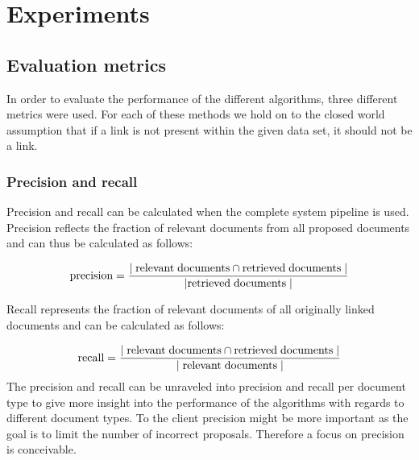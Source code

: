 \section{Experiments}
\label{sec:experiments}
\subsection{Evaluation metrics}
In order to evaluate the performance of the different algorithms, three different metrics were used. For each of these methods we hold on to the closed world assumption that if a link is not present within the given data set, it should not be a link. 

\subsubsection{Precision and recall} 
Precision and recall can be calculated when the complete system pipeline is used. Precision reflects the fraction of relevant documents from all proposed documents and can thus be calculated as follows:

\begin{align*}
  \textrm{precision} = \frac{|\;\textrm{relevant\;documents} \cap \textrm{retrieved\;documents}\;|}{|\textrm{retrieved\;documents}\;|}
\end{align*}

Recall represents the fraction of relevant documents of all originally linked documents and can be calculated as follows:

\begin{align}
  \nonumber \textrm{recall} = \frac{|\;\textrm{relevant\;documents} \cap \textrm{retrieved\;documents}\;|}{|\;\textrm{relevant\;documents}\;|}
\end{align}
The precision and recall can be unraveled into precision and recall per
document type to give more insight into the performance of the algorithms with
regards to different document types. To the client precision might be more
important as the goal is to limit the number of incorrect proposals. Therefore
a focus on precision is conceivable.

